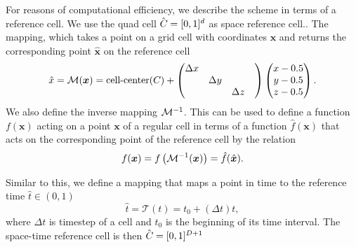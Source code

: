 For reasons of computational efficiency, we describe the scheme in terms of a reference cell.
We use the quad cell $\hat{C_{}} = [0, 1]^d$ as space reference cell..
The mapping, which takes a point on a grid cell with coordinates $\bm{x}$ and returns the corresponding point $\hat{\bm{x}}$ on the reference cell
\begin{equation}\label{eq:space-mapping}
  \hat{x} = \mathcal{M} (\bm{x}) =
  \operatorname{cell-center}(C_{}) +
\begin{pmatrix}
\Delta x && \\
&\Delta y & \\
&&\Delta z&
\end{pmatrix}
  \begin{pmatrix}
    x - 0.5\\
    y - 0.5\\
    z - 0.5
  \end{pmatrix}.
\end{equation}
We also define the inverse mapping $\mathcal{M}^{-1}$.
This can be used to define a function $f(\bm{x})$ acting on a point $\bm{x}$ of a regular cell in terms of a function $\hat{f}(\bm{x})$ that acts on the corresponding point of the reference cell by the relation
\begin{equation}
  \label{eq:function-ref-cell}
  f(\bm{x}) = f\left( \mathcal{M}^{-1}(\bm{x}) \right) = \hat{f}(\hat{\bm{x}}).
\end{equation}

Similar to this, we define a mapping that maps a point in time to the reference time $\hat{t} \in (0,1)$
\newcommand{\timeMapping}{\mathcal{T}}
\begin{equation}
  \label{eq:time-mapping}
  \hat{t} = \timeMapping(t) = t_0 + (\Delta t) t,
\end{equation}
where $\Delta t$ is timestep of a cell and $t_0$ is the beginning of its time interval.
The space-time reference cell is then $\hat{C_{}} = [0,1]^{D+1}$

